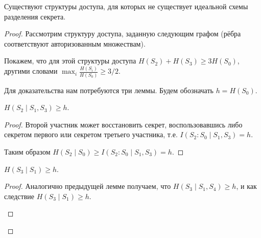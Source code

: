 \documentclass[12pt]{article}
\begin{document}
\begin{statement}
    Существуют структуры доступа, для которых не существует идеальной схемы разделения секрета.
\end{statement}
\begin{proof}
    Рассмотрим структуру доступа, заданную следующим графом (рёбра соответствуют авторизованным
    множествам).
    \begin{center}
    \end{center}
    Покажем, что для этой структуры доступа $H(S_2) + H(S_3) \ge 3H(S_0)$, другими словами
    $\max_i\frac{H(S_i)}{H(S_0)} \ge 3/2$.

    Для доказательства нам потребуются три леммы. Будем обозначать $h = H(S_0)$.
    \begin{lemma}
        $H(S_2\mid S_1, S_3) \ge h$.
    \end{lemma}
    \begin{proof} Второй участник может восстановить секрет, воспользовавшись либо секретом первого
        или секретом третьего участника, т.е. $I(S_2 : S_0 \mid S_1, S_3) = h$.
    \begin{center}
    \end{center}
    Таким образом $H(S_2 \mid S_0) \ge  I(S_2:S_0\mid S_1,S_3) = h$.
    \end{proof}

    \begin{lemma}
        $H(S_3\mid S_1) \ge h$.
    \end{lemma}
    \begin{proof} Аналогично предыдущей лемме получаем, что $H(S_3\mid S_1, S_4)\ge h$, и как
        следствие $H(S_3\mid S_1)\ge h$.
    \begin{center}
\end{center}
\end{proof}
\end{proof}
\end{document}

